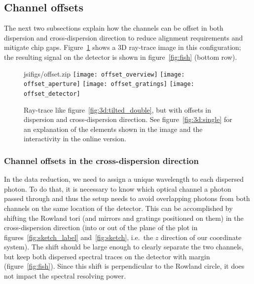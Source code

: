 \documentclass[twocolumn]{aastex631}
\begin{document}
\subsection{Channel offsets}
The next two subsections explain how the channels can be offset in both dispersion and cross-dispersion direction to reduce alignment requirements and mitigate chip gaps. Figure~\ref{fig:3d:tilted_double_offset} shows a 3D ray-trace image in this configuration; the resulting signal on the detector is shown in figure~\ref{fig:fish} (bottom row).

\begin{figure}
    \begin{interactive}{js}{ifigs/offset.zip}
    \texttt{[image: offset\_overview]}
    \texttt{[image: offset\_aperture]}
    \texttt{[image: offset\_gratings]}
    \texttt{[image: offset\_detector]}
    \end{interactive}
    \caption{Ray-trace like figure~\ref{fig:3d:tilted_double}, but with offsets in dispersion and cross-dispersion direction. See figure~\ref{fig:3d:single} for an explanation of the elements shown in the image and the interactivity in the online version.
        }
    \label{fig:3d:tilted_double_offset}
\end{figure}




\subsubsection{Channel offsets in the cross-dispersion direction}
In the data reduction, we need to assign a unique wavelength to each dispersed photon. To do that, it is necessary to know which optical channel a photon passed through and thus the setup needs to avoid overlapping photons from both channels on the same location of the detector. This can be accomplished by shifting the Rowland tori (and mirrors and gratings positioned on them) in the cross-dispersion direction (into or out of the plane of the plot in figures~\ref{fig:sketch_label} and~\ref{fig:sketch}, i.e.\ the $z$ direction of our coordinate system). The shift should be large enough to clearly separate the two channels, but keep both dispersed spectral traces on the detector with margin (figure~\ref{fig:fish}). Since this shift is perpendicular to the Rowland circle, it does not impact the spectral resolving power.
\end{document}
